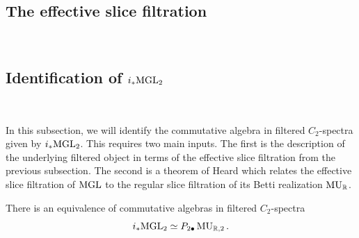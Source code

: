


\subsection{The effective slice filtration} \label{sec:eff}\ 



\subsection{Identification of $i_* \mathrm{MGL}_2$}\ 

In this subsection, we will identify the commutative algebra in filtered $C_2$-spectra given by $i_* \mathrm{MGL}_2$.
This requires two main inputs.
The first is the description of the underlying filtered object in terms of the effective slice filtration from the previous subsection.
The second is a theorem of Heard which relates the effective slice filtration of $\mathrm{MGL}$ to the regular slice filtration of its Betti realization $\operatorname{\mathrm{MU}}_{\mathbb{R}}$.



\begin{prop} \label{prop:P-MGL}
  There is an equivalence of commutative algebras in filtered $C_2$-spectra
  \[ i_* \mathrm{MGL}_2  \simeq P_{2\bullet} \operatorname{\mathrm{MU}}_{\mathbb{R},2}. \]
\end{prop}     

